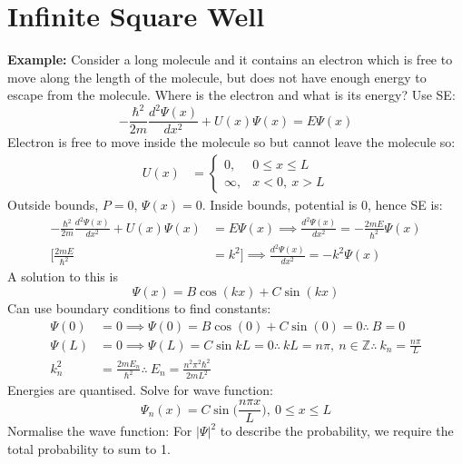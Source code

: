 \documentclass[a4paper, 11pt, normalem]{report}
\begin{document}
\section{Infinite Square Well}
\textbf{Example:}
Consider a long molecule and it contains an electron which is free to move along the length of the molecule, but does not have enough energy to escape from the molecule.
Where is the electron and what is its energy?
Use SE:
\begin{equation}
     -\frac{\hbar^{2}}{2m}\frac{d^{2} \Psi(x)}{d x^{2}} + U(x)\Psi(x) = E\Psi(x)
\end{equation}
Electron is free to move inside the molecule so but cannot leave the molecule so:
\begin{align}
    U(x) &=
    \begin{cases}
        0,      & 0 \leq x \leq L \\
        \infty, & x < 0,~x > L
    \end{cases}
\end{align}
Outside bounds, $P = 0$, $\Psi(x) = 0$.
Inside bounds, potential is 0, hence SE is:
\begin{align}
    -\frac{\hbar^{2}}{2m}\frac{d^{2} \Psi(x)}{d x^{2}} + U(x)\Psi(x) &= E\Psi(x) \implies \frac{d^{2} \Psi(x)}{d x^{2}} = -\frac{2mE}{\hbar^{2}}\Psi(x) \\
    \Big[\frac{2mE}{\hbar^{2}} &= k^{2}\Big] \implies \frac{d^{2} \Psi(x)}{d x^{2}} = -k^{2}\Psi(x)
\end{align}
A solution to this is
\begin{equation}
    \Psi(x) = B\cos(kx) + C\sin(kx)
\end{equation}
Can use boundary conditions to find constants:
\begin{align}
    \Psi(0) &= 0 \implies \Psi(0) = B\cos(0) + C\sin(0) = 0  \therefore ~ B = 0 \\
    \Psi(L) &= 0 \implies \Psi(L) = C\sin{kL} = 0 \therefore ~ kL = n\pi,~n \in \mathbb{Z} \therefore ~ k_{n} = \frac{n\pi}{L} \\
    k_{n}^{2} &= \frac{2mE_{n}}{\hbar^{2}} \therefore ~ E_{n} = \frac{n^{2}\pi^{2}\hbar^{2}}{2mL^{2}}
\end{align}
Energies are quantised.
Solve for wave function:
\begin{equation}
    \Psi_{n}(x) = C\sin\Big(\frac{n\pi x}{L}\Big),~0 \leq x \leq L
\end{equation}
Normalise the wave function: For $|\Psi|^{2}$ to describe the probability, we require the total probability to sum to 1.
\end{document}
